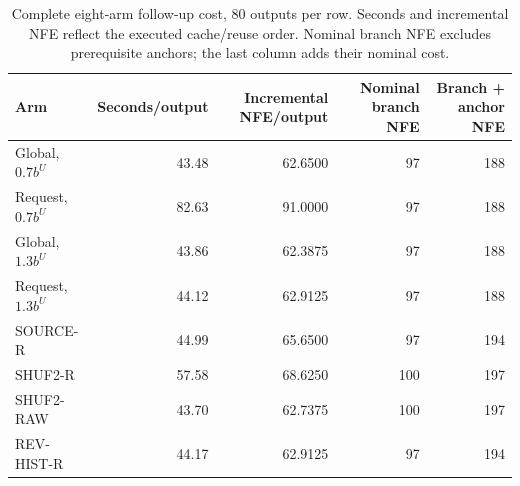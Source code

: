 \begin{table}[!t]
\centering\footnotesize
\caption{Complete eight-arm follow-up cost, 80 outputs per row. Seconds and incremental NFE reflect the executed cache/reuse order. Nominal branch NFE excludes prerequisite anchors; the last column adds their nominal cost.}
\label{tab:r89-cost}
\begin{tabular}{lrrrr}
\toprule
Arm & Seconds/output & Incremental NFE/output & Nominal branch NFE & Branch + anchor NFE\\
\midrule
Global, $0.7b^U$ & 43.48 & 62.6500 & 97 & 188 \\
Request, $0.7b^U$ & 82.63 & 91.0000 & 97 & 188 \\
Global, $1.3b^U$ & 43.86 & 62.3875 & 97 & 188 \\
Request, $1.3b^U$ & 44.12 & 62.9125 & 97 & 188 \\
SOURCE-R & 44.99 & 65.6500 & 97 & 194 \\
SHUF2-R & 57.58 & 68.6250 & 100 & 197 \\
SHUF2-RAW & 43.70 & 62.7375 & 100 & 197 \\
REV-HIST-R & 44.17 & 62.9125 & 97 & 194 \\
\bottomrule
\end{tabular}
\end{table}
